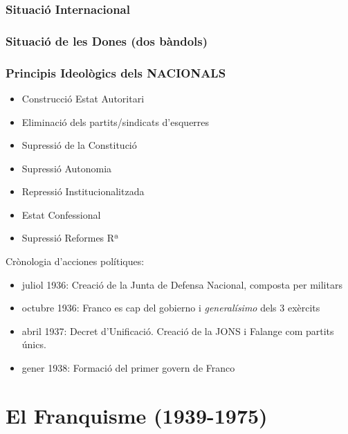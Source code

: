\documentclass[arial,a4paper,print]{article}
\begin{document}
\subsubsection{Situació Internacional}
\subsubsection{Situació de les Dones (dos bàndols)}
\subsubsection{Principis Ideològics dels NACIONALS}
\begin{itemize}
	\item Construcció Estat Autoritari
	\item Eliminació dels partits/sindicats d'esquerres
	\item Supressió de la Constitució
	\item Supressió Autonomia
	\item Repressió Institucionalitzada
	\item Estat Confessional
	\item Supressió Reformes Rª
\end{itemize}


Crònologia d'acciones polítiques:
\begin{itemize}
\item juliol 1936: Creació de la Junta de Defensa Nacional, composta per militars
\item octubre 1936: Franco es cap del gobierno i \textit{generalísimo} dels 3 exèrcits
\item abril 1937: Decret d'Unificació. Creació de la JONS i Falange com partits únics.
\item gener 1938: Formació del primer govern de Franco
\end{itemize}

\section{El Franquisme (1939-1975)}
\end{document}
